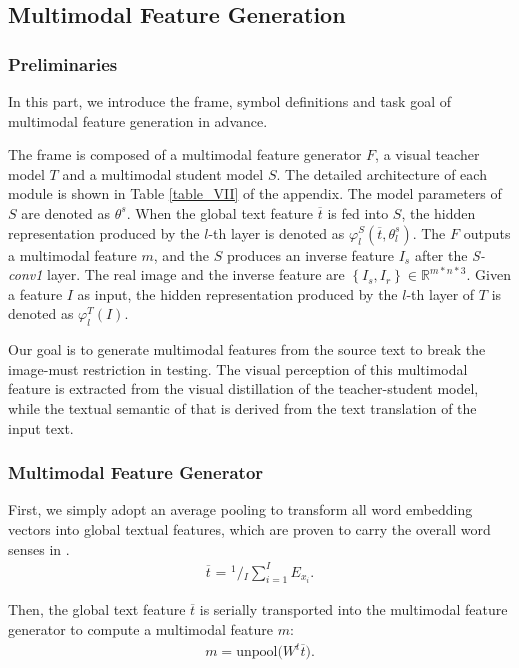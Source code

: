 \documentclass[11pt]{article}
\begin{document}
\subsection{Multimodal Feature Generation}
\subsubsection{Preliminaries}
In this part, we introduce the frame, symbol definitions and task goal of multimodal feature generation in advance.

The frame is composed of a multimodal feature generator $F$, a visual teacher model $T$ and a multimodal student model $S$.
The detailed architecture of each module is shown in Table \ref{table_VII} of the appendix.
The model parameters of $S$ are denoted as ${{\theta }^{s}}$.
When the global text feature $\overline{t}$ is fed into $S$, the hidden representation produced by the $l$-th layer is denoted as $\varphi _{l}^{S}\left( \overline{t},\theta _{l}^{s} \right)$.
The $F$ outputs a multimodal feature $m$, and the $S$ produces an inverse feature ${{I}_{s}}$ after the \textit{S-conv1} layer.
The real image and the inverse feature are $\left\{ {{I}_{s}},{{I}_{r}} \right\}\in {{\mathbb{R}}^{m*n*3}}$.
Given a feature $I$ as input, the hidden representation produced by the $l$-th layer of $T$ is denoted as $\varphi _{l}^{T}(I)$.

Our goal is to generate multimodal features from the source text to break the image-must restriction in testing.
The visual perception of this multimodal feature is extracted from the visual distillation of the teacher-student model, while the textual semantic of that is derived from the text translation of the input text.


\subsubsection{Multimodal Feature Generator}
First, we simply adopt an average pooling to transform all word embedding vectors into global textual features, which are proven to carry the overall word senses in \cite{zhang2010understanding}.
\begin{gather}
\overline{t}\text{ = }{}^{1}/{}_{I}\sum\limits_{i=1}^{I}{{{E}_{{{x}_{i}}}}}.\label{eq:5}
\end{gather}

Then, the global text feature $\overline{t}$ is serially transported into the multimodal feature generator to compute a multimodal feature $m$:
\begin{gather}
m=\text{unpool(}{{W}^{t}}\overline{t}\text{)}.\label{eq:6}
\end{gather}
\end{document}

